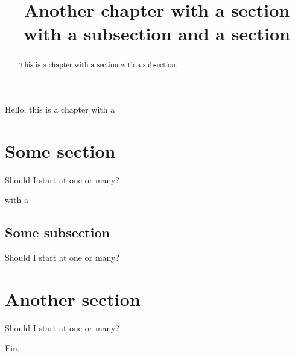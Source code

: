 \documentclass{ximera}
\title{Another chapter with a section with a subsection and a section}
\providecommand{\xmsection}{\section}
\providecommand{\xmsubsection}{\subsection}
\begin{document}
\begin{abstract}
  This is a chapter with a section with a subsection.
\end{abstract}
\maketitle




Hello, this is a chapter with a

\xmsection{Some section}
\begin{theorem}
  Should I start at one or many?
\end{theorem}
with a

\xmsubsection{Some subsection}
\begin{theorem}
  Should I start at one or many?
\end{theorem}

\xmsection{Another section}
\begin{theorem}
  Should I start at one or many?
\end{theorem}

Fin.
\end{document}
